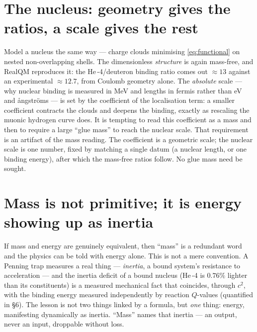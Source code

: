 \documentclass[11pt]{article}
\begin{document}
\section{The nucleus: geometry gives the ratios, a scale gives the rest}
Model a nucleus the same way --- charge clouds minimising \eqref{eq:functional} on nested non-overlapping shells.
The dimensionless \emph{structure} is again mass-free, and RealQM reproduces it: the He\,-4/deuteron binding ratio
comes out $\approx 13$ against an experimental $\approx 12.7$, from Coulomb geometry alone. The \emph{absolute}
scale --- why nuclear binding is measured in MeV and lengths in fermis rather than eV and \aa{}ngstr\"oms --- is
set by the coefficient of the localisation term: a smaller coefficient contracts the clouds and deepens the
binding, exactly as rescaling the muonic hydrogen curve does. It is tempting to read this coefficient as a mass
and then to require a large ``glue mass'' to reach the nuclear scale. That requirement is an artifact of the mass
reading. The coefficient is a geometric scale; the nuclear scale is one number, fixed by matching a single datum
(a nuclear length, or one binding energy), after which the mass-free ratios follow. No glue mass need be sought.

\section{Mass is not primitive; it is energy showing up as inertia}
If mass and energy are genuinely equivalent, then ``mass'' is a redundant word and the physics can be told with
energy alone. This is not a mere convention. A Penning trap measures a real thing --- \emph{inertia}, a bound
system's resistance to acceleration --- and the inertia deficit of a bound nucleus (He\,-4 is $0.76\%$ lighter
than its constituents) is a measured mechanical fact that coincides, through $c^2$, with the binding energy
measured independently by reaction $Q$-values (quantified in \S6). The lesson is not two things linked by a
formula, but \emph{one} thing: energy, manifesting dynamically as inertia. ``Mass'' names that inertia --- an
output, never an input, droppable without loss.
\end{document}
